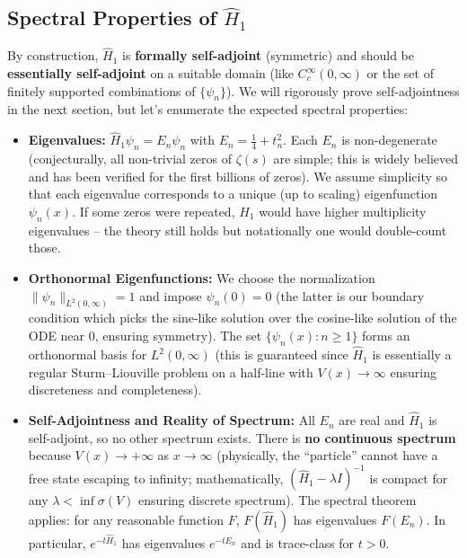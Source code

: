 \documentclass[12pt]{article}
\theoremstyle{plain}
\theoremstyle{definition}
\begin{document}
\subsection{Spectral Properties of \(\hat{H}_1\)}

By construction, \(\hat{H}_1\) is \textbf{formally self-adjoint} (symmetric) and should be \textbf{essentially self-adjoint} on a suitable domain (like \(C_c^\infty(0,\infty)\) or the set of finitely supported combinations of \(\{\psi_n\}\)). We will rigorously prove self-adjointness in the next section, but let's enumerate the expected spectral properties:

\begin{itemize}
    \item \textbf{Eigenvalues:} \(\hat{H}_1 \psi_n = E_n \psi_n\) with \(E_n = \frac{1}{4} + t_n^2\). Each \(E_n\) is non-degenerate (conjecturally, all non-trivial zeros of \(\zeta(s)\) are simple; this is widely believed and has been verified for the first billions of zeros). We assume simplicity so that each eigenvalue corresponds to a unique (up to scaling) eigenfunction \(\psi_n(x)\). If some zeros were repeated, \(\hat{H}_1\) would have higher multiplicity eigenvalues -- the theory still holds but notationally one would double-count those.
    
    \item \textbf{Orthonormal Eigenfunctions:} We choose the normalization \(\|\psi_n\|_{L^2(0,\infty)} = 1\) and impose \(\psi_n(0)=0\) (the latter is our boundary condition which picks the sine-like solution over the cosine-like solution of the ODE near 0, ensuring symmetry). The set \(\{\psi_n(x): n\ge1\}\) forms an orthonormal basis for \(L^2(0,\infty)\) (this is guaranteed since \(\hat{H}_1\) is essentially a regular Sturm--Liouville problem on a half-line with \(V(x)\to\infty\) ensuring discreteness and completeness).
    
    \item \textbf{Self-Adjointness and Reality of Spectrum:} All \(E_n\) are real and \(\hat{H}_1\) is self-adjoint, so no other spectrum exists. There is \textbf{no continuous spectrum} because \(V(x)\to+\infty\) as \(x\to\infty\) (physically, the ``particle'' cannot have a free state escaping to infinity; mathematically, \((\hat{H}_1 - \lambda I)^{-1}\) is compact for any \(\lambda < \inf \sigma(V)\) ensuring discrete spectrum). The spectral theorem applies: for any reasonable function \(F\), \(F(\hat{H}_1)\) has eigenvalues \(F(E_n)\). In particular, \(e^{-t\hat{H}_1}\) has eigenvalues \(e^{-tE_n}\) and is trace-class for \(t>0\).
    

\end{itemize}
\end{document}
